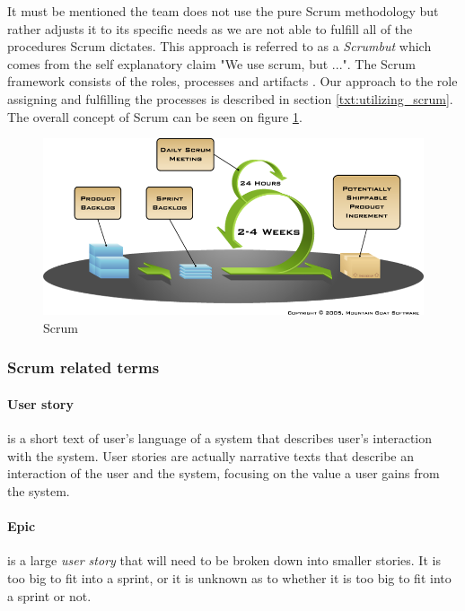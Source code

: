 It must be mentioned the team does not use the pure Scrum methodology but rather adjusts it to its specific needs as we are not able to fulfill all of the procedures Scrum dictates. This approach is referred to as a \textit{Scrumbut} \cite{viscardi2013professional} which comes from the self explanatory claim "We use scrum, but ...".  The Scrum framework consists of the roles, processes and artifacts \cite{viscardi2013professional}. Our approach to the role assigning and fulfilling the processes is described in section \ref{txt:utilizing_scrum}. The overall concept of Scrum can be seen on figure \ref{fig:scrum}.

\begin{figure}[hbt]
\centering
\includegraphics[width=\textwidth]{preliminaryStudies/scrum.png}
\caption{Scrum}
\label{fig:scrum}
\end{figure}

\subsubsection{Scrum related terms}

\paragraph{User story}
is a short text of user's language of a system that describes user's interaction with the system. User stories are actually narrative texts that describe an interaction of the user and the system, focusing on the value a user gains from the system.

\paragraph{Epic}
is a large \emph{user story} that will need to be broken down into smaller stories. It is too big to fit into a sprint, or it is unknown as to whether it is too big to fit into a sprint or not.

